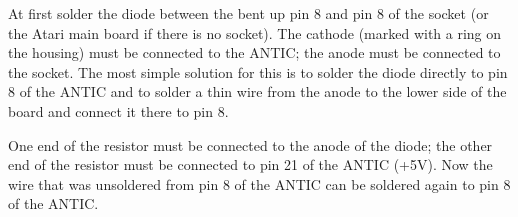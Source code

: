 At first solder the diode between the bent up pin 8 and pin 8 of the socket (or
the Atari main board if there is no socket). The cathode (marked with a ring on
the housing) must be connected to the ANTIC; the anode must be connected to the
socket. The most simple solution for this is to solder the diode directly to pin 8
of the ANTIC and to solder a thin wire from the anode to the lower side of the
board and connect it there to pin 8.

One end of the resistor must be connected to the anode of the diode; the other
end of the resistor must be connected to pin 21 of the ANTIC (+5V). Now the
wire that was unsoldered from pin 8 of the ANTIC can be soldered again to pin 8
of the ANTIC.
